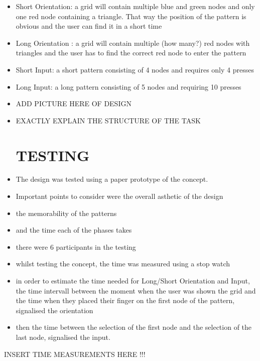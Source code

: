 \begin{itemize}
\item Short Orientation: a grid will contain multiple blue and green nodes and only one red node containing a triangle. That way the position of the pattern is obvious and the user can find it in a short time 
\item Long Orientation : a grid will contain multiple (how many?) red nodes with triangles and the user has to find the correct red node to enter the pattern
\item Short Input: a short pattern consisting of 4 nodes and requires only 4 presses 
\item Long Input: a long pattern consisting of 5 nodes and requiring 10 presses 
\item ADD PICTURE HERE OF DESIGN
\item EXACTLY EXPLAIN THE STRUCTURE OF THE TASK

\section{TESTING}

\item The design was tested using a paper prototype of the concept.
\item Important points to consider were the overall asthetic of the design
\item the memorability of the patterns 
\item and the time each of the phases takes 
\item there were 6 participants in the testing 
\item whilst testing the concept, the time was measured using a stop watch 
\item in order to estimate the time needed for Long/Short Orientation and Input, the time intervall between the moment when the user was shown the grid and the time when they placed their finger on the first node of the pattern, signalised the orientation
\item then the time between the selection of the first node and the selection of the last node, signalised the input. 
\end{itemize}
INSERT TIME MEASUREMENTS HERE !!! 

